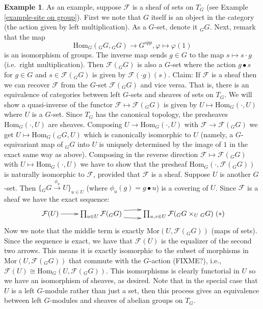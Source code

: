 \documentclass{amsart}
\theoremstyle{definition}
\newtheorem{example}[theorem]{Example}
\theoremstyle{remark}
\numberwithin{equation}{subsection}
\begin{document}
\begin{example}
As an example, suppose $\mathcal{F}$ is a sheaf of sets on $T_G$
(see Example \ref{example-site on group}).  First we note that $G$ 
itself is an object in the category (the action given by left 
multiplication). As a $G$-set, denote it ${}_GG$. Next, remark that
the map
$$
\text{Hom}_G({}_GG,{}_GG) \longrightarrow G^{opp}, 
\varphi \longmapsto \varphi(1)
$$
is an isomorphism of groups. The inverse map sends $g \in G$
to the map $ s \mapsto s \cdot g$ (i.e.\ right multiplication). Then
$\mathcal{F}({}_GG)$ is also a $G$-set where the action $g \bullet s$
for $g \in G$ and $s \in \mathcal{F}({}_GG)$ is given by
$\mathcal{F}(\cdot g)(s)$. Claim: If $\mathcal{F}$ is a sheaf then we
can recover $\mathcal{F}$ from the $G$-set $\mathcal{F}({}_GG)$
and vice versa. That is, there is an equivalence of categories
between left $G$-sets and sheaves of sets on $T_G$. We will show a
quasi-inverse of the functor $\mathcal{F} \mapsto \mathcal{F}({}_GG)$ is
given by $U \mapsto \text{Hom}_G(\cdot, U)$ where $U$ is a $G$-set. 
Since $T_G$ has the canonical topology, the presheaves  
$\text{Hom}_G(\cdot, U)$ are sheaves.
Composing $U \rightarrow \text{Hom}_G(\cdot, U)$ with 
$\mathcal{F} \rightarrow \mathcal{F}({}_GG)$ we get 
$U \mapsto \text{Hom}_G({}_GG,U)$ which is
canonically isomorphic to $U$ (namely, a $G$-equivariant map of ${}_GG$ 
into $U$ is uniquely determined by the image of $1$ in the exact same way 
as above). Composing in the reverse direction $\mathcal{F} \mapsto 
\mathcal{F}({}_GG)$ with $U \mapsto \text{Hom}_G(\cdot, U)$ we have to 
show that the presheaf $\text{Hom}_G(\cdot, \mathcal{F}({}_GG))$ is naturally
isomorphic to $\mathcal{F}$, provided that $\mathcal{F}$ is a sheaf.
Suppose $U$ is another $G$-set. Then
$\{{}_GG \stackrel{\phi_u}{\rightarrow} U\}_{u \in U}$ (where
$\phi_u(g) = g \bullet u$) is a covering of $U$. Since $\mathcal{F}$ is a 
sheaf we have the exact sequence:
$$
\xymatrix{ \mathcal{F}(U) \ar[r] & \prod\nolimits_{u \in U}
\mathcal{F}({}_GG) \ar@/^/[r] \ar@/_/[r] & \prod\nolimits_{u, v \in
U} \mathcal{F}({}_GG \times_U{}_GG) } \leqno{(*)}
$$
Now we note that the middle term is exactly 
$\text{Mor}(U,\mathcal{F}({}_GG))$ (maps of sets). Since the sequence is 
exact, we have that $\mathcal{F}(U)$ is the equalizer of the second two
arrows. This means it is exactly isomorphic to the subset of morphisms in
$\text{Mor}(U, \mathcal{F}(_G G))$ that commute with the $G$-action (FIXME?),
i.e., $\mathcal{F}(U) \cong \text{Hom}_G(U, \mathcal{F}({}_GG))$.
This isomorphisms is clearly functorial in $U$ so we have an
isomorphism of sheaves, as desired. Note that in the special case that 
$U$ is a left $G$-module rather than just a set, then this process gives 
an equivalence between left $G$-modules and sheaves of abelian groups on $T_G$.
\end{example}
\end{document}
